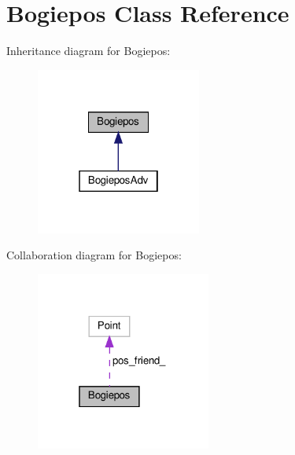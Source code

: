 \hypertarget{classBogiepos}{}\section{Bogiepos Class Reference}
\label{classBogiepos}


Inheritance diagram for Bogiepos\+:\nopagebreak
\begin{figure}[H]
\begin{center}
\leavevmode
\includegraphics[width=154pt]{classBogiepos__inherit__graph}
\end{center}
\end{figure}


Collaboration diagram for Bogiepos\+:\nopagebreak
\begin{figure}[H]
\begin{center}
\leavevmode
\includegraphics[width=163pt]{classBogiepos__coll__graph}
\end{center}
\end{figure}
